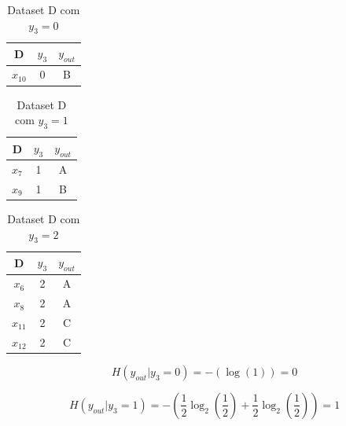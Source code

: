 \documentclass{article}
\begin{document}
\begin{center}
\begin{minipage}[b]{0.3\linewidth}
  \centering
  \begin{table}[H]
    \centering
    \begin{tabular}{|c|c|c|}
      \hline
      D     & $y_3$ & $y_{out}$ \\ \hline
      $x_{10}$ & 0     & B         \\ \hline
    \end{tabular}
    \caption{Dataset D com $y_3 = 0$}
    \label{tab:datasetDy3=0}
  \end{table}
\end{minipage}
\begin{minipage}[b]{0.3\linewidth}
  \centering
  \begin{table}[H]
    \centering
    \begin{tabular}{|c|c|c|}
      \hline
      D     & $y_3$ & $y_{out}$ \\ \hline
      $x_7$ & 1     & A         \\ \hline
      $x_9$ & 1     & B         \\ \hline
    \end{tabular}
    \caption{Dataset D com $y_3 = 1$}
    \label{tab:datasetDy3=1}
  \end{table}
\end{minipage}
\begin{minipage}[b]{0.3\linewidth}
  \centering
  \begin{table}[H]
    \centering
    \begin{tabular}{|c|c|c|}
      \hline
      D     & $y_3$ & $y_{out}$ \\ \hline
      $x_6$ & 2     & A         \\ \hline
      $x_8$ & 2     & A         \\ \hline
      $x_{11}$ & 2     & C         \\ \hline
      $x_{12}$ & 2     & C         \\ \hline
    \end{tabular}
    \caption{Dataset D com $y_3 = 2$}
    \label{tab:datasetDy3=2}
  \end{table}
\end{minipage}
\end{center}


\[ H(y_{out}|y_3 = 0) = - \left( \log(1) \right) = 0 \]

\[ H(y_{out}|y_3 = 1) = - \left( \frac{1}{2} \log_2 \left( \frac{1}{2} \right) + \frac{1}{2} \log_2 \left( \frac{1}{2} \right) \right) = 1 \]
\end{document}
